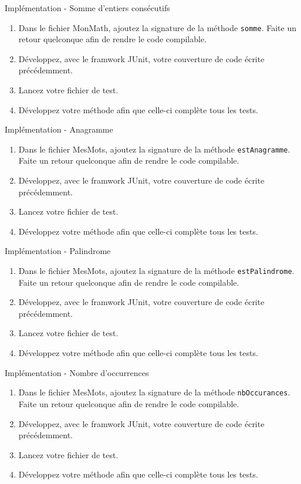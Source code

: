 \documentclass[a4paper,11pt]{article}
\begin{document}
	\begin{Exercice}{Implémentation - Somme d'entiers consécutifs}
		\begin{enumerate}
			\item Dans le fichier MonMath, ajoutez la signature de la méthode \texttt{somme}. Faite un retour quelconque afin de rendre le code compilable.
			\item Développez, avec le framwork JUnit, votre couverture de code écrite précédemment.
			\item Lancez votre fichier de test.
			\item Développez votre méthode afin que celle-ci complète tous les tests.
		\end{enumerate}
	\end{Exercice}
	
	\begin{Exercice}{Implémentation - Anagramme}
		\begin{enumerate}
			\item Dans le fichier MesMots, ajoutez la signature de la méthode \texttt{estAnagramme}. Faite un retour quelconque afin de rendre le code compilable.
			\item Développez, avec le framwork JUnit, votre couverture de code écrite précédemment.
			\item Lancez votre fichier de test.
			\item Développez votre méthode afin que celle-ci complète tous les tests.
		\end{enumerate}
	\end{Exercice}

	\begin{Exercice}{Implémentation - Palindrome}
		\begin{enumerate}
			\item Dans le fichier MesMots, ajoutez la signature de la méthode \texttt{estPalindrome}. Faite un retour quelconque afin de rendre le code compilable.
			\item Développez, avec le framwork JUnit, votre couverture de code écrite précédemment.
			\item Lancez votre fichier de test.
			\item Développez votre méthode afin que celle-ci complète tous les tests.
		\end{enumerate}
	\end{Exercice}

	\begin{Exercice}{Implémentation - Nombre d’occurrences}
		\begin{enumerate}
			\item Dans le fichier MesMots, ajoutez la signature de la méthode \texttt{nbOccurances}. Faite un retour quelconque afin de rendre le code compilable.
			\item Développez, avec le framwork JUnit, votre couverture de code écrite précédemment.
			\item Lancez votre fichier de test.
			\item Développez votre méthode afin que celle-ci complète tous les tests.
		\end{enumerate}
		
	\end{Exercice}
\end{document}
